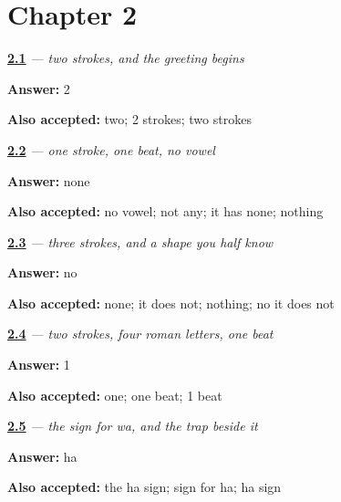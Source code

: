 \section*{Chapter 2}

\noindent\begin{minipage}[t]{\linewidth}
\raggedright
\hyperlink{review-JA-W01-ko-strokes}{\textbf{2.1}} \emph{ — two strokes, and the greeting begins}\par
\small \textbf{Answer:} 2\par
\footnotesize \textbf{Also accepted:} two; 2 strokes; two strokes
\end{minipage}\par\medskip

\noindent\begin{minipage}[t]{\linewidth}
\raggedright
\hyperlink{review-JA-W01-n-vowel}{\textbf{2.2}} \emph{ — one stroke, one beat, no vowel}\par
\small \textbf{Answer:} none\par
\footnotesize \textbf{Also accepted:} no vowel; not any; it has none; nothing
\end{minipage}\par\medskip

\noindent\begin{minipage}[t]{\linewidth}
\raggedright
\hyperlink{review-JA-W01-ni-shared}{\textbf{2.3}} \emph{ — three strokes, and a shape you half know}\par
\small \textbf{Answer:} no\par
\footnotesize \textbf{Also accepted:} none; it does not; nothing; no it does not
\end{minipage}\par\medskip

\noindent\begin{minipage}[t]{\linewidth}
\raggedright
\hyperlink{review-JA-W01-chi-beats}{\textbf{2.4}} \emph{ — two strokes, four roman letters, one beat}\par
\small \textbf{Answer:} 1\par
\footnotesize \textbf{Also accepted:} one; one beat; 1 beat
\end{minipage}\par\medskip

\noindent\begin{minipage}[t]{\linewidth}
\raggedright
\hyperlink{review-JA-W01-wa-particle}{\textbf{2.5}} \emph{ — the sign for \emph{wa}, and the trap beside it}\par
\small \textbf{Answer:} ha\par
\footnotesize \textbf{Also accepted:} the ha sign; sign for ha; ha sign
\end{minipage}\par\medskip

